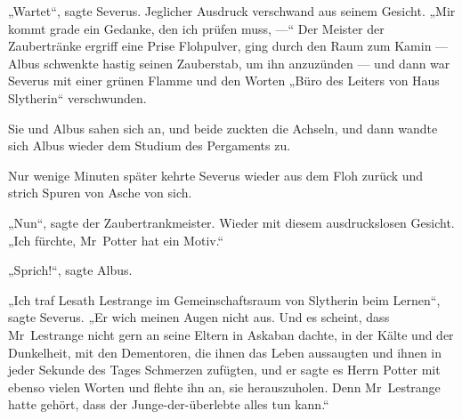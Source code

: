„Wartet“, sagte Severus. Jeglicher Ausdruck verschwand aus seinem Gesicht.
„Mir kommt grade ein Gedanke, den ich prüfen muss, —“ Der Meister der Zaubertränke ergriff eine Prise Flohpulver, ging durch den Raum zum Kamin — Albus schwenkte hastig seinen Zauberstab, um ihn anzuzünden — und dann war Severus mit einer grünen Flamme und den Worten
„Büro des Leiters von Haus Slytherin“ verschwunden.

Sie und Albus sahen sich an, und beide zuckten die Achseln, und dann wandte sich Albus wieder dem Studium des Pergaments zu.

Nur wenige Minuten später kehrte Severus wieder aus dem Floh zurück und strich Spuren von Asche von sich.

„Nun“, sagte der Zaubertrankmeister. Wieder mit diesem ausdruckslosen Gesicht.
„Ich fürchte, Mr~Potter hat ein Motiv.“

„Sprich!“, sagte Albus.

„Ich traf Lesath Lestrange im Gemeinschaftsraum von Slytherin beim Lernen“, sagte Severus.
„Er wich meinen Augen nicht aus. Und es scheint, dass Mr~Lestrange nicht gern an seine Eltern in Askaban dachte, in der Kälte und der Dunkelheit, mit den Dementoren, die ihnen das Leben aussaugten und ihnen in jeder Sekunde des Tages Schmerzen zufügten, und er sagte es Herrn Potter mit ebenso vielen Worten und flehte ihn an, sie herauszuholen. Denn Mr~Lestrange hatte gehört, dass der Junge-der-überlebte alles tun kann.“

